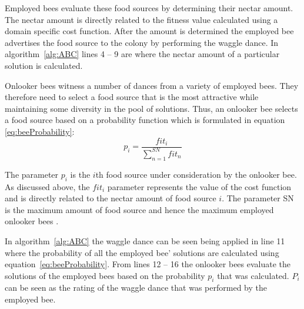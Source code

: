 Employed bees evaluate these food sources by determining their nectar amount\cite{ABCCompareStudy,ABCLeafConstrained,ABCNumericalOptimization,ABCImageEnhancement}. The nectar amount is directly related to the fitness value calculated using a domain specific cost function\cite{ABCCompareStudy,ABCLeafConstrained,ABCReconfigDistro}. After the amount is determined the employed bee advertises the food source to the colony by performing the waggle dance. In algorithm~\ref{alg:ABC} lines 4 -- 9 are where the nectar amount of a particular solution is calculated.

Onlooker bees witness a number of dances from a variety of employed bees\cite{ABCFusionGrid,BeeJobShop,ABCNumericalOptimization,ABCImageEnhancement,ABCReconfigDistro}. They therefore need to select a food source that is the most attractive while maintaining some diversity in the pool of solutions. Thus, an onlooker bee selects a food source based on a probability function which is formulated in equation \ref{eq:beeProbability}\cite{ABCCompareStudy}:
\begin{equation}
\label{eq:beeProbability}
p_i = \frac{{fit}_i}{\sum^{SN}_{n=1}{fit}_n}
\end{equation}

The parameter $p_i$ is the $i$th food source under consideration by the onlooker bee. As discussed above, the ${fit}_i$ parameter represents the value of the cost function and is directly related to the nectar amount of food source $i$. The parameter SN is the maximum amount of food source and hence the maximum employed onlooker bees \cite{ABCCompareStudy}.

In algorithm~\ref{alg:ABC} the waggle dance can be seen being applied in line 11 where the probability of all the employed bee' solutions are calculated using equation~\ref{eq:beeProbability}. From lines 12 -- 16 the onlooker bees evaluate the solutions of the employed bees based on the probability $p_i$ that was calculated. $P_i$ can be seen as the rating of the waggle dance that was performed by the employed bee.

